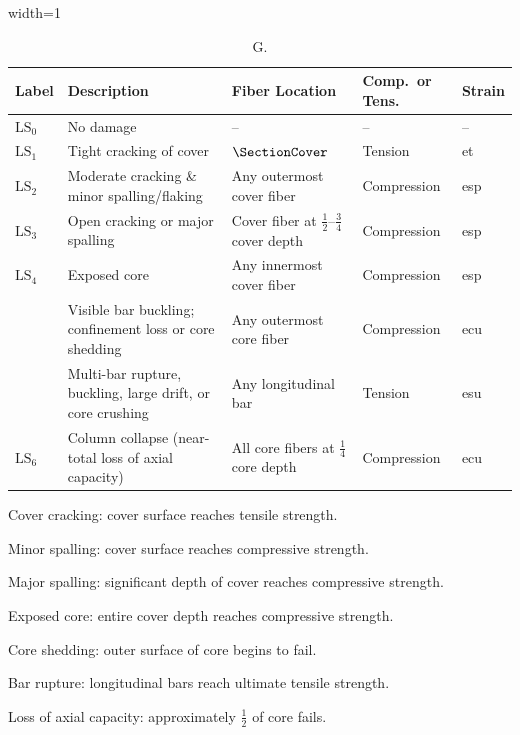\begin{table}[H]
\centering
\caption{G.}
\begin{adjustbox}{width=1\textwidth}
\begin{threeparttable}
\renewcommand{\arraystretch}{1.4}
\begin{tabular}{>{\centering\arraybackslash}m{1.2cm}
                 m{5.0cm}
                 m{3.6cm}
                 >{\centering\arraybackslash}m{2.4cm}
                 >{\centering\arraybackslash}m{1.4cm}}
\toprule
\textbf{Label} & \textbf{Description} &
\textbf{Fiber Location} & \textbf{Comp.\ or Tens.} & \textbf{Strain} \\
\midrule

$\mathrm{LS}_{0}$ & No damage & -- & -- & -- \\
$\mathrm{LS}_{1}$ & Tight cracking of cover\tnote{a} & $\SectionCover$ & Tension & \gls{et} \\
$\mathrm{LS}_{2}$ & Moderate cracking \& minor spalling/flaking\tnote{b} & Any outermost cover fiber & Compression & \gls{esp} \\
$\mathrm{LS}_{3}$ & Open cracking or major spalling\tnote{c} & Cover fiber at $\tfrac{1}{2}$--$\tfrac{3}{4}$ cover depth & Compression & \gls{esp} \\
$\mathrm{LS}_{4}$ & Exposed core\tnote{d} & Any innermost cover fiber & Compression & \gls{esp} \\
\multirow{2}{*}{$\mathrm{LS}_{5}$}
    & Visible bar buckling; confinement loss or core shedding\tnote{e} & Any outermost core fiber & Compression & \gls{ecu} \\
    & Multi-bar rupture, buckling, large drift, or core crushing\tnote{f} & Any longitudinal bar & Tension & \gls{esu} \\
$\mathrm{LS}_{6}$ & Column collapse (near-total loss of axial capacity)\tnote{g} & All core fibers at $\tfrac{1}{4}$ core depth & Compression & \gls{ecu} \\
\bottomrule
\end{tabular}
\begin{tablenotes}\footnotesize
  \item[a] Cover cracking: cover surface reaches tensile strength.
  \item[b] Minor spalling: cover surface reaches compressive strength.
  \item[c] Major spalling: significant depth of cover reaches compressive strength.
  \item[d] Exposed core: entire cover depth reaches compressive strength.
  \item[e] Core shedding: outer surface of core begins to fail.
  \item[f] Bar rupture: longitudinal bars reach ultimate tensile strength.
  \item[g] Loss of axial capacity: approximately $\tfrac{1}{2}$ of core fails.
\end{tablenotes}
\end{threeparttable}
\end{adjustbox}
\label{tab:DSv4}
\end{table}
